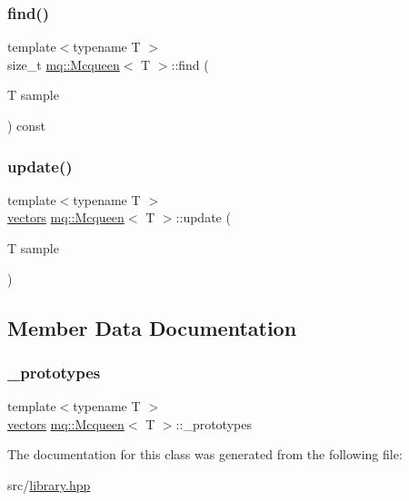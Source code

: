 \subsubsection{\texorpdfstring{find()}{find()}}
{\footnotesize\ttfamily template$<$typename T $>$ \\
size\+\_\+t \mbox{\hyperlink{classmq_1_1Mcqueen}{mq\+::\+Mcqueen}}$<$ T $>$\+::find (\begin{DoxyParamCaption}\item[{T}]{sample }\end{DoxyParamCaption}) const\hspace{0.3cm}{\ttfamily [private]}}

\mbox{\label{classmq_1_1Mcqueen_abb4b840cc6d7a540fe23da4b9f518281}} 
\subsubsection{\texorpdfstring{update()}{update()}}
{\footnotesize\ttfamily template$<$typename T $>$ \\
\mbox{\hyperlink{classmq_1_1Mcqueen_a4615619809177f994658d0841443a725}{vectors}} \mbox{\hyperlink{classmq_1_1Mcqueen}{mq\+::\+Mcqueen}}$<$ T $>$\+::update (\begin{DoxyParamCaption}\item[{T}]{sample }\end{DoxyParamCaption})}



\subsection{Member Data Documentation}
\mbox{\label{classmq_1_1Mcqueen_a1fec25641cc2efe5a6f1af1118651d73}} 
\subsubsection{\texorpdfstring{\+\_\+prototypes}{\_prototypes}}
{\footnotesize\ttfamily template$<$typename T $>$ \\
\mbox{\hyperlink{classmq_1_1Mcqueen_a4615619809177f994658d0841443a725}{vectors}} \mbox{\hyperlink{classmq_1_1Mcqueen}{mq\+::\+Mcqueen}}$<$ T $>$\+::\+\_\+prototypes\hspace{0.3cm}{\ttfamily [private]}}



The documentation for this class was generated from the following file\+:\begin{DoxyCompactItemize}
\item 
src/\mbox{\hyperlink{library_8hpp}{library.\+hpp}}\end{DoxyCompactItemize}
